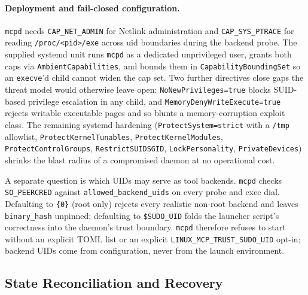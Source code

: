 \paragraph{Deployment and fail-closed configuration.}
\texttt{mcpd} needs \texttt{CAP\_\allowbreak NET\_\allowbreak ADMIN} for Netlink administration and \texttt{CAP\_\allowbreak SYS\_\allowbreak PTRACE} for reading \texttt{/\allowbreak proc/\allowbreak <pid>/\allowbreak exe} across uid boundaries during the backend probe.
The supplied systemd unit runs \texttt{mcpd} as a dedicated unprivileged user, grants both caps via \texttt{Ambient\allowbreak Capabilities}, and bounds them in \texttt{Capability\allowbreak Bounding\allowbreak Set} so an \texttt{execve}'d child cannot widen the cap set.
Two further directives close gaps the threat model would otherwise leave open: \texttt{No\allowbreak New\allowbreak Privileges=true} blocks SUID-based privilege escalation in any child, and \texttt{Memory\allowbreak Deny\allowbreak Write\allowbreak Execute=true} rejects writable executable pages and so blunts a memory-corruption exploit class.
The remaining systemd hardening (\texttt{Protect\allowbreak System=strict} with a \texttt{/\allowbreak tmp} allowlist, \texttt{Protect\allowbreak Kernel\allowbreak Tunables}, \texttt{Protect\allowbreak Kernel\allowbreak Modules}, \texttt{Protect\allowbreak Control\allowbreak Groups}, \texttt{Restrict\allowbreak SUIDSGID}, \texttt{Lock\allowbreak Personality}, \texttt{Private\allowbreak Devices}) shrinks the blast radius of a compromised daemon at no operational cost.

A separate question is which UIDs may serve as tool backends.
\texttt{mcpd} checks \texttt{SO\_\allowbreak PEERCRED} against \texttt{allowed\_\allowbreak backend\_\allowbreak uids} on every probe and exec dial.
Defaulting to \texttt{\{0\}} (root only) rejects every realistic non-root backend and leaves \texttt{binary\_\allowbreak hash} unpinned; defaulting to \texttt{\$SUDO\_\allowbreak UID} folds the launcher script's correctness into the daemon's trust boundary.
\texttt{mcpd} therefore refuses to start without an explicit TOML list or an explicit \texttt{LINUX\_\allowbreak MCP\_\allowbreak TRUST\_\allowbreak SUDO\_\allowbreak UID} opt-in; backend UIDs come from configuration, never from the launch environment.



\subsection{State Reconciliation and Recovery}
\label{sec:reconciliation}

